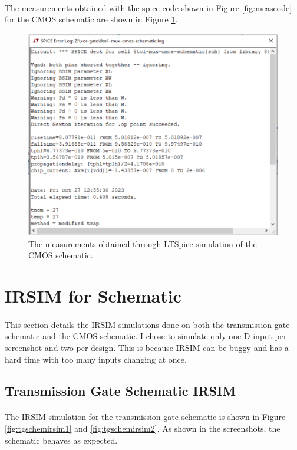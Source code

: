 \documentclass{article}
\begin{document}
    \paragraph{}
    The measurements obtained with the spice code shown in Figure \ref{fig:meascode} for the CMOS schematic are shown in Figure \ref{fig:cmosschemmeas}.

    \begin{figure}[H]
      \centering
      \includegraphics[width=0.5\linewidth, frame]{screenshots/cmos/schem/meas.png}
      \caption{The measurements obtained through LTSpice simulation of the CMOS schematic.}
      \label{fig:cmosschemmeas}
    \end{figure}



\section{IRSIM for Schematic}
  \paragraph{}
  This section details the IRSIM simulations done on both the transmission gate schematic and the CMOS schematic. I chose to simulate only one D input per screenshot and two per design. This is because IRSIM can be buggy and has a hard time with too many inputs changing at once.  

  \subsection{Transmission Gate Schematic IRSIM}
    \paragraph{}
    The IRSIM simulation for the transmission gate schematic is shown in Figure \ref{fig:tgschemirsim1} and \ref{fig:tgschemirsim2}. As shown in the screenshots, the schematic behaves as expected.
\end{document}
